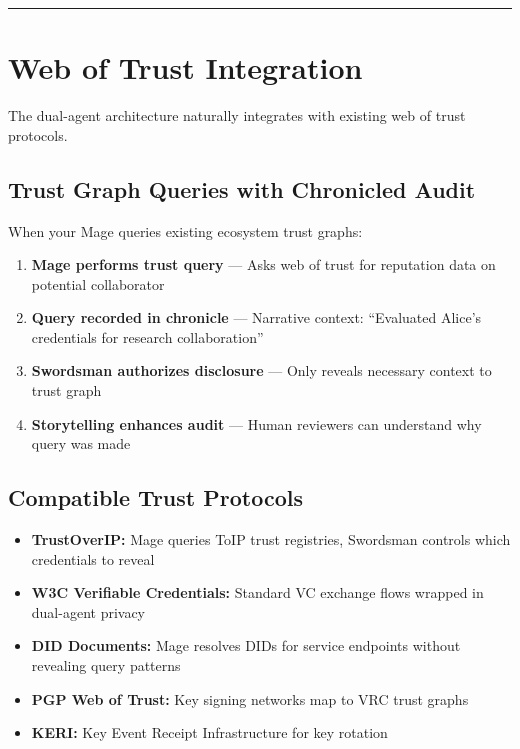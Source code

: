 \documentclass[
]{article}
\begin{document}
\begin{center}\rule{0.5\linewidth}{0.5pt}\end{center}

\section{Web of Trust Integration}\label{web-of-trust-integration}

The dual-agent architecture naturally integrates with existing web of
trust protocols.

\subsection{Trust Graph Queries with Chronicled
Audit}\label{trust-graph-queries-with-chronicled-audit}

When your Mage queries existing ecosystem trust graphs:

\begin{enumerate}
\def\labelenumi{\arabic{enumi}.}
\item
  \textbf{Mage performs trust query} --- Asks web of trust for
  reputation data on potential collaborator
\item
  \textbf{Query recorded in chronicle} --- Narrative context:
  ``Evaluated Alice's credentials for research collaboration''
\item
  \textbf{Swordsman authorizes disclosure} --- Only reveals necessary
  context to trust graph
\item
  \textbf{Storytelling enhances audit} --- Human reviewers can
  understand why query was made
\end{enumerate}

\subsection{Compatible Trust
Protocols}\label{compatible-trust-protocols}

\begin{itemize}
\item
  \textbf{TrustOverIP:} Mage queries ToIP trust registries, Swordsman
  controls which credentials to reveal
\item
  \textbf{W3C Verifiable Credentials:} Standard VC exchange flows
  wrapped in dual-agent privacy
\item
  \textbf{DID Documents:} Mage resolves DIDs for service endpoints
  without revealing query patterns
\item
  \textbf{PGP Web of Trust:} Key signing networks map to VRC trust
  graphs
\item
  \textbf{KERI:} Key Event Receipt Infrastructure for key rotation
\end{itemize}
\end{document}
